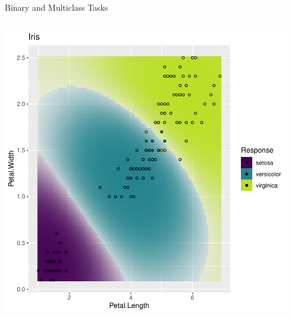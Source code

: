 \documentclass[11pt,compress,t,notes=noshow, xcolor=table]{beamer}
\begin{document}
\begin{vbframe}{Binary and Multiclass Tasks}
\begin{columns}[T]
\begin{column}{0.5\textwidth}
\begin{knitrout}
{\centering \includegraphics[width=0.95\textwidth]{figure/reg_class_task_2} 

}



\end{knitrout}
  \end{column}
\end{columns}
\end{vbframe}
\end{document}
